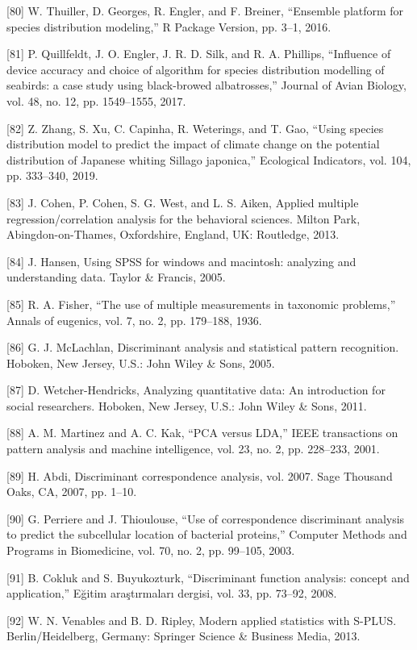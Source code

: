 \documentclass[sn-mathphys-num]{sn-jnl}%
\begin{document}
[80] W. Thuiller, D. Georges, R. Engler, and F. Breiner, “Ensemble platform for species distribution modeling,” R Package Version, pp. 3–1, 2016.

[81] P. Quillfeldt, J. O. Engler, J. R. D. Silk, and R. A. Phillips, “Influence of device accuracy and choice of algorithm for species distribution modelling of seabirds: a case study using black-browed albatrosses,” Journal of Avian Biology, vol. 48, no. 12, pp. 1549–1555, 2017.

[82] Z. Zhang, S. Xu, C. Capinha, R. Weterings, and T. Gao, “Using species distribution model to predict the impact of climate change on the potential distribution of Japanese whiting Sillago japonica,” Ecological Indicators, vol. 104, pp. 333–340, 2019.

[83] J. Cohen, P. Cohen, S. G. West, and L. S. Aiken, Applied multiple regression/correlation analysis for the behavioral sciences. Milton Park, Abingdon-on-Thames, Oxfordshire, England, UK: Routledge, 2013.

[84] J. Hansen, Using SPSS for windows and macintosh: analyzing and understanding data. Taylor & Francis, 2005.

[85] R. A. Fisher, “The use of multiple measurements in taxonomic problems,” Annals of eugenics, vol. 7, no. 2, pp. 179–188, 1936.

[86] G. J. McLachlan, Discriminant analysis and statistical pattern recognition. Hoboken, New Jersey, U.S.: John Wiley & Sons, 2005.

[87] D. Wetcher-Hendricks, Analyzing quantitative data: An introduction for social researchers. Hoboken, New Jersey, U.S.: John Wiley & Sons, 2011.

[88] A. M. Martinez and A. C. Kak, “PCA versus LDA,” IEEE transactions on pattern analysis and machine intelligence, vol. 23, no. 2, pp. 228–233, 2001.

[89] H. Abdi, Discriminant correspondence analysis, vol. 2007. Sage Thousand Oaks, CA, 2007, pp. 1–10.

[90] G. Perriere and J. Thioulouse, “Use of correspondence discriminant analysis to predict the subcellular location of bacterial proteins,” Computer Methods and Programs in Biomedicine, vol. 70, no. 2, pp. 99–105, 2003.

[91] B. Cokluk and S. Buyukozturk, “Discriminant function analysis: concept and application,” Eğitim araştırmaları dergisi, vol. 33, pp. 73–92, 2008.

[92] W. N. Venables and B. D. Ripley, Modern applied statistics with S-PLUS. Berlin/Heidelberg, Germany: Springer Science & Business Media, 2013.
\end{document}
